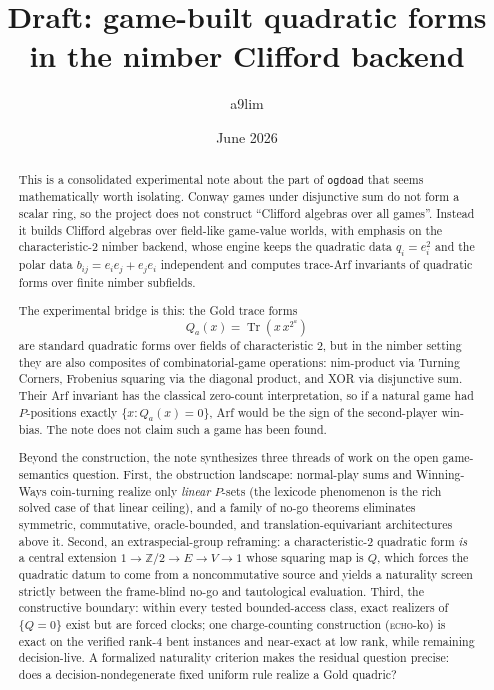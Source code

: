 \documentclass[11pt]{article}
\title{Draft: game-built quadratic forms in the nimber Clifford backend}
\author{a9lim}
\date{June 2026}
\theoremstyle{plain}
\theoremstyle{definition}
\newcommand{\Tr}{\operatorname{Tr}}
\begin{document}
\maketitle

\begin{abstract}
This is a consolidated experimental note about the part of \texttt{ogdoad} that
seems mathematically worth isolating. Conway games under disjunctive sum do not
form a scalar ring, so the project does not construct ``Clifford algebras over
all games''. Instead it builds Clifford algebras over field-like game-value
worlds, with emphasis on the characteristic-$2$ nimber backend, whose engine
keeps the quadratic data $q_i=e_i^2$ and the polar data
$b_{ij}=e_ie_j+e_je_i$ independent and computes trace-Arf invariants of
quadratic forms over finite nimber subfields.

The experimental bridge is this: the Gold trace forms
\[
  Q_a(x)=\Tr(x\,x^{2^a})
\]
are standard quadratic forms over fields of characteristic $2$, but in the
nimber setting they are also composites of combinatorial-game operations:
nim-product via Turning Corners, Frobenius squaring via the diagonal product,
and XOR via disjunctive sum. Their Arf invariant has the classical zero-count
interpretation, so if a natural game had $P$-positions exactly
$\{x:Q_a(x)=0\}$, Arf would be the sign of the second-player win-bias. The
note does not claim such a game has been found.

Beyond the construction, the note synthesizes three threads of work on the
open game-semantics question. First, the obstruction landscape: normal-play
sums and Winning-Ways coin-turning realize only \emph{linear} $P$-sets
(the lexicode phenomenon is the rich solved case of that linear ceiling), and
a family of no-go theorems eliminates symmetric, commutative, oracle-bounded,
and translation-equivariant architectures above it. Second, an
extraspecial-group reframing: a characteristic-$2$ quadratic form \emph{is} a
central extension $1\to\mathbb{Z}/2\to E\to V\to 1$ whose squaring map is $Q$,
which forces the quadratic datum to come from a noncommutative source and
yields a naturality screen strictly between the frame-blind no-go and
tautological evaluation. Third, the constructive boundary: within every tested
bounded-access class, exact realizers of $\{Q=0\}$ exist but are forced
clocks; one charge-counting construction (\textsc{echo}-ko) is exact on
the verified rank-$4$ bent instances and near-exact at low rank, while
remaining decision-live. A formalized naturality
criterion makes the residual question precise: does a decision-nondegenerate
fixed uniform rule realize a Gold quadric?
\end{abstract}
\end{document}
